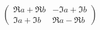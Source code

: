 \begin{displaymath}
 \begin{pmatrix}
  \Re a + \Re b & -\Im a + \Im b \\
 \Im a + \Im b & \Re a - \Re b
 \end{pmatrix}
\end{displaymath}
